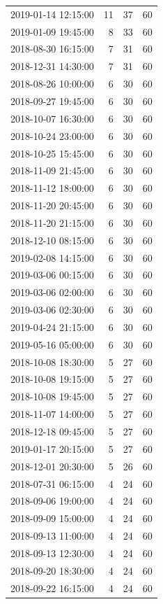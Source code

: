\begin{tabular}{lrrr}
2019-01-14 12:15:00 & 11 & 37 & 60 \\
2019-01-09 19:45:00 & 8 & 33 & 60 \\
2018-08-30 16:15:00 & 7 & 31 & 60 \\
2018-12-31 14:30:00 & 7 & 31 & 60 \\
2018-08-26 10:00:00 & 6 & 30 & 60 \\
2018-09-27 19:45:00 & 6 & 30 & 60 \\
2018-10-07 16:30:00 & 6 & 30 & 60 \\
2018-10-24 23:00:00 & 6 & 30 & 60 \\
2018-10-25 15:45:00 & 6 & 30 & 60 \\
2018-11-09 21:45:00 & 6 & 30 & 60 \\
2018-11-12 18:00:00 & 6 & 30 & 60 \\
2018-11-20 20:45:00 & 6 & 30 & 60 \\
2018-11-20 21:15:00 & 6 & 30 & 60 \\
2018-12-10 08:15:00 & 6 & 30 & 60 \\
2019-02-08 14:15:00 & 6 & 30 & 60 \\
2019-03-06 00:15:00 & 6 & 30 & 60 \\
2019-03-06 02:00:00 & 6 & 30 & 60 \\
2019-03-06 02:30:00 & 6 & 30 & 60 \\
2019-04-24 21:15:00 & 6 & 30 & 60 \\
2019-05-16 05:00:00 & 6 & 30 & 60 \\
2018-10-08 18:30:00 & 5 & 27 & 60 \\
2018-10-08 19:15:00 & 5 & 27 & 60 \\
2018-10-08 19:45:00 & 5 & 27 & 60 \\
2018-11-07 14:00:00 & 5 & 27 & 60 \\
2018-12-18 09:45:00 & 5 & 27 & 60 \\
2019-01-17 20:15:00 & 5 & 27 & 60 \\
2018-12-01 20:30:00 & 5 & 26 & 60 \\
2018-07-31 06:15:00 & 4 & 24 & 60 \\
2018-09-06 19:00:00 & 4 & 24 & 60 \\
2018-09-09 15:00:00 & 4 & 24 & 60 \\
2018-09-13 11:00:00 & 4 & 24 & 60 \\
2018-09-13 12:30:00 & 4 & 24 & 60 \\
2018-09-20 18:30:00 & 4 & 24 & 60 \\
2018-09-22 16:15:00 & 4 & 24 & 60 \\

\end{tabular}
